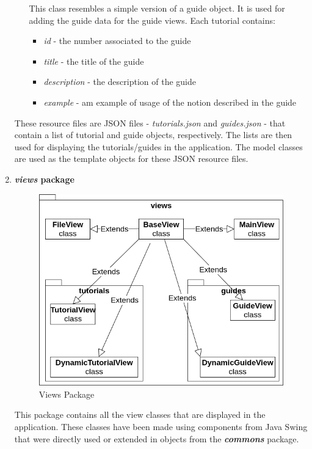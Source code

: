 \documentclass[12pt,a4paper,twoside]{report}
\begin{document}
\begin{enumerate}
\begin{itemize}
    This class resembles a simple version of a guide object. It is used for adding the guide data for the guide views. Each tutorial contains:
    \begin{itemize}
        \item \textit{id} - the number associated to the guide
        \item \textit{title} - the title of the guide
        \item \textit{description} - the description of the guide
        \item \textit{example} - am example of usage of the notion described in the guide
    \end{itemize}
\end{itemize}
These resource files are JSON files - \textit{tutorials.json} and \textit{guides.json} - that contain a list of tutorial and guide objects, respectively. The lists are then used for displaying the tutorials/guides in the application. The model classes are used as the template objects for these JSON resource files.

\item \textbf{\textit{views} package}

\begin{figure}[H]
    \centering
    \includegraphics[width=0.8\linewidth]{img/diags/ViewsPackage.png}
    \caption{Views Package}
    \label{fig:conf}
\end{figure}

This package contains all the view classes that are displayed in the application. These classes have been made using components from Java Swing that were directly used or extended in objects from the \textbf{\textit{commons}} package.


\end{enumerate}
\end{document}
